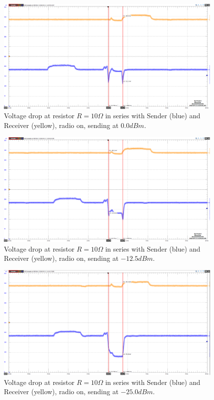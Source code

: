 \begin{figure}[H]
	\centering
	\includegraphics[width=0.8\linewidth]{implementation/energylab/fig/radioOn_sendHighSignal.png}
	\caption{Voltage drop at resistor $R=10\Omega$ in series with Sender (blue) and Receiver (yellow), radio on, sending at $0.0dBm$.}
	\label{fig:radioOn_sendHighSignal}
\end{figure}

\begin{figure}[H]
	\centering
	\includegraphics[width=0.8\linewidth]{implementation/energylab/fig/radioOn_sendMidSignal.png}
	\caption{Voltage drop at resistor $R=10\Omega$ in series with Sender (blue) and Receiver (yellow), radio on, sending at $-12.5dBm$.}
	\label{fig:radioOn_sendMidSignal}
\end{figure}

\begin{figure}[H]
	\centering
	\includegraphics[width=0.8\linewidth]{implementation/energylab/fig/radioOn_sendLowSignal.png}
	\caption{Voltage drop at resistor $R=10\Omega$ in series with Sender (blue) and Receiver (yellow), radio on, sending at $-25.0dBm$.}
	\label{fig:radioOn_sendLowSignal}
\end{figure}


